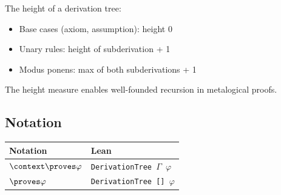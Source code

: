 \documentclass[../BimodalReference.tex]{subfiles}
\begin{document}
\begin{definition}[Height]
The height of a derivation tree:
\begin{itemize}
  \item Base cases (axiom, assumption): height 0
  \item Unary rules: height of subderivation + 1
  \item Modus ponens: max of both subderivations + 1
\end{itemize}
\end{definition}

The height measure enables well-founded recursion in metalogical proofs.

\subsection{Notation}

\begin{center}
\begin{tabular}{@{}ll@{}}
\toprule
Notation & Lean \\
\midrule
$\context \proves \varphi$ & \texttt{DerivationTree $\Gamma$ $\varphi$} \\
$\proves \varphi$ & \texttt{DerivationTree [] $\varphi$} \\
\bottomrule
\end{tabular}
\end{center}
\end{document}
